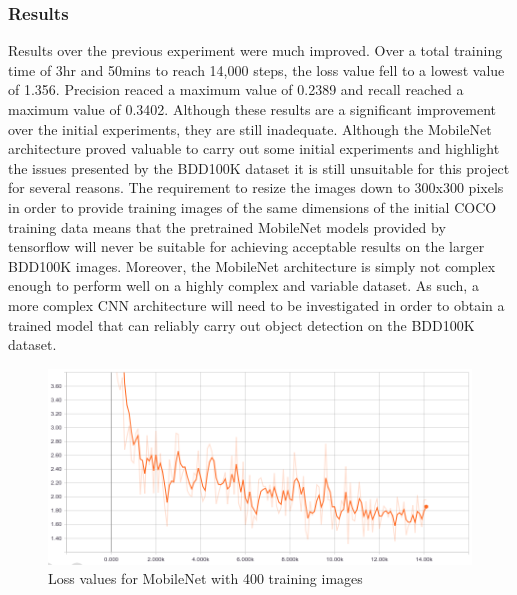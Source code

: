 \documentclass[12pt]{report}
\begin{document}
\subsubsection{Results}
\begin{flushleft}
Results over the previous experiment were much improved. Over a total training time of 3hr and 50mins to reach 14,000 steps, the loss value fell to a lowest value of 1.356. Precision reaced a maximum value of 0.2389 and recall reached a maximum value of 0.3402. Although these results are a significant improvement over the initial experiments, they are still inadequate. Although the MobileNet architecture proved valuable to carry out some initial experiments and highlight the issues presented by the BDD100K dataset it is still unsuitable for this project for several reasons. The requirement to resize the images down to 300x300 pixels in order to provide training images of the same dimensions of the initial COCO training data means that the pretrained MobileNet models provided by tensorflow will never be suitable for achieving acceptable results on the larger BDD100K images. Moreover, the MobileNet architecture is simply not complex enough to perform well on a highly complex and variable dataset. As such, a more complex CNN architecture will need to be investigated in order to obtain a trained model that can reliably carry out object detection on the BDD100K dataset.
\end{flushleft}

\vspace{0.5cm}
\begin{figure}[ht!]
	\centering
	\includegraphics[width=15cm]{loss-mobilenet-2}
	\caption{Loss values for MobileNet with 400 training images}
	\label{fig:loss-mobilenet-2}
\end{figure}
\end{document}
